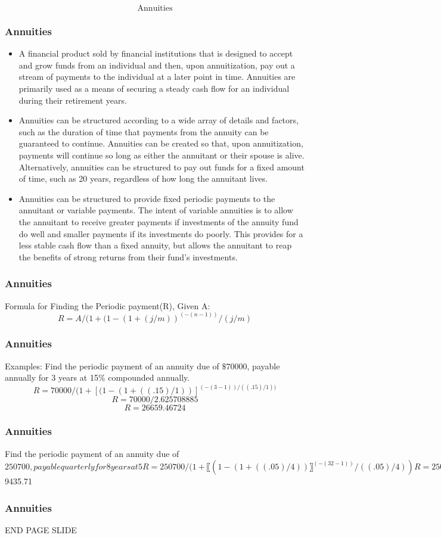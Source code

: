 \documentclass{beamer}
\begin{document}
\begin{frame}
\Large
\[\mbox{Annuities}\]
\end{frame}
\begin{frame}
\frametitle{Annuities}
\begin{itemize}
\item A financial product sold by financial institutions that is designed to accept and grow funds from an individual and then, upon annuitization, pay out a stream of payments to the individual at a later point in time. Annuities are primarily used as a means of securing a steady cash flow for an individual during their retirement years.
 
\item Annuities can be structured according to a wide array of details and factors, such as the duration of time that payments from the annuity can be guaranteed to continue. Annuities can be created so that, upon annuitization, payments will continue so long as either the annuitant or their spouse is alive. Alternatively, annuities can be structured to pay out funds for a fixed amount of time, such as 20 years, regardless of how long the annuitant lives.
 
\item Annuities can be structured to provide fixed periodic payments to the annuitant or variable payments. The intent of variable annuities is to allow the annuitant to receive greater payments if investments of the annuity fund do well and smaller payments if its investments do poorly. This provides for a less stable cash flow than a fixed annuity, but allows the annuitant to reap the benefits of strong returns from their fund's investments.
 
 \end{itemize}
\end{frame}
\begin{frame}
\frametitle{Annuities}
Formula for Finding the Periodic payment(R), Given A:
\[R = A/(1+(1-(1+(j/m) )^(-(n-1))/(j/m)\]
\end{frame}

\begin{frame}
\frametitle{Annuities}
Examples:
Find the periodic payment of an annuity due of $\$70000$, payable annually for 3 years at 15\% compounded annually.
\[R = 70000/(1+[(1-(1+((.15)/1) )]^{(-(3-1))/((.15)/1))}\]
\[R = 70000/2.625708885\]
\[R = 26659.46724\]
\end{frame}

\begin{frame}
\frametitle{Annuities}
Find the periodic payment of an annuity due of $250700, payable quarterly for 8 years at 5%
R= 250700/(1+〖(1-(1+((.05)/4) )〗^(-(32-1))/((.05)/4))
R = 250700/26.5692901
R = $9435.71
\end{frame}

\begin{frame}
\frametitle{Annuities}
END PAGE SLIDE
\end{frame}
\end{document}
